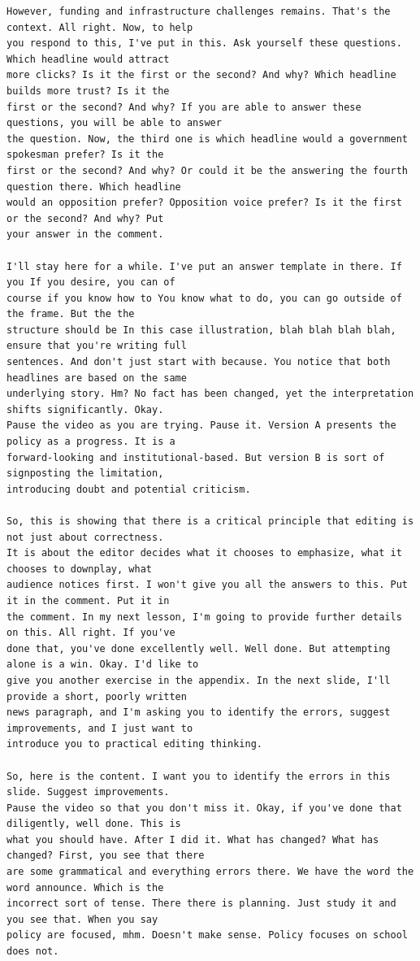 {\begin{Verbatim}
However, funding and infrastructure challenges remains. That's the context. All right. Now, to help
you respond to this, I've put in this. Ask yourself these questions. Which headline would attract
more clicks? Is it the first or the second? And why? Which headline builds more trust? Is it the
first or the second? And why? If you are able to answer these questions, you will be able to answer
the question. Now, the third one is which headline would a government spokesman prefer? Is it the
first or the second? And why? Or could it be the answering the fourth question there. Which headline
would an opposition prefer? Opposition voice prefer? Is it the first or the second? And why? Put
your answer in the comment.

I'll stay here for a while. I've put an answer template in there. If you If you desire, you can of
course if you know how to You know what to do, you can go outside of the frame. But the the
structure should be In this case illustration, blah blah blah blah, ensure that you're writing full
sentences. And don't just start with because. You notice that both headlines are based on the same
underlying story. Hm? No fact has been changed, yet the interpretation shifts significantly. Okay.
Pause the video as you are trying. Pause it. Version A presents the policy as a progress. It is a
forward-looking and institutional-based. But version B is sort of signposting the limitation,
introducing doubt and potential criticism.

So, this is showing that there is a critical principle that editing is not just about correctness.
It is about the editor decides what it chooses to emphasize, what it chooses to downplay, what
audience notices first. I won't give you all the answers to this. Put it in the comment. Put it in
the comment. In my next lesson, I'm going to provide further details on this. All right. If you've
done that, you've done excellently well. Well done. But attempting alone is a win. Okay. I'd like to
give you another exercise in the appendix. In the next slide, I'll provide a short, poorly written
news paragraph, and I'm asking you to identify the errors, suggest improvements, and I just want to
introduce you to practical editing thinking.

So, here is the content. I want you to identify the errors in this slide. Suggest improvements.
Pause the video so that you don't miss it. Okay, if you've done that diligently, well done. This is
what you should have. After I did it. What has changed? What has changed? First, you see that there
are some grammatical and everything errors there. We have the word the word announce. Which is the
incorrect sort of tense. There there is planning. Just study it and you see that. When you say
policy are focused, mhm. Doesn't make sense. Policy focuses on school does not.


\end{Verbatim}}
